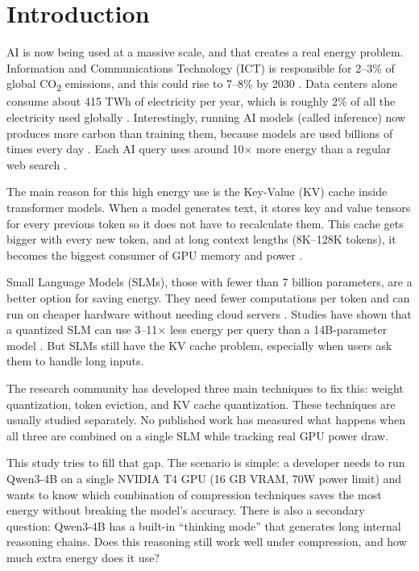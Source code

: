 \documentclass[conference]{IEEEtran}
\begin{document}
\section{Introduction}

AI is now being used at a massive scale, and that creates a real energy problem. Information and Communications Technology (ICT) is responsible for 2--3\% of global CO\textsubscript{2} emissions, and this could rise to 7--8\% by 2030 \cite{iea2024}. Data centers alone consume about 415 TWh of electricity per year, which is roughly 2\% of all the electricity used globally \cite{iea2024}. Interestingly, running AI models (called inference) now produces more carbon than training them, because models are used billions of times every day \cite{strubell2019, patterson2021}. Each AI query uses around 10$\times$ more energy than a regular web search \cite{cse407disc}.

The main reason for this high energy use is the Key-Value (KV) cache inside transformer models. When a model generates text, it stores key and value tensors for every previous token so it does not have to recalculate them. This cache gets bigger with every new token, and at long context lengths (8K--128K tokens), it becomes the biggest consumer of GPU memory and power \cite{kivi, flashattn}.

Small Language Models (SLMs), those with fewer than 7 billion parameters, are a better option for saving energy. They need fewer computations per token and can run on cheaper hardware without needing cloud servers \cite{edgeenergy2025, sustainablellm2026}. Studies have shown that a quantized SLM can use 3--11$\times$ less energy per query than a 14B-parameter model \cite{edgeenergy2025}. But SLMs still have the KV cache problem, especially when users ask them to handle long inputs.

The research community has developed three main techniques to fix this: weight quantization, token eviction, and KV cache quantization. These techniques are usually studied separately. No published work has measured what happens when all three are combined on a single SLM while tracking real GPU power draw.

This study tries to fill that gap. The scenario is simple: a developer needs to run \mbox{Qwen3-4B} on a single NVIDIA T4 GPU (16 GB VRAM, 70W power limit) and wants to know which combination of compression techniques saves the most energy without breaking the model's accuracy. There is also a secondary question: \mbox{Qwen3-4B} has a built-in ``thinking mode'' that generates long internal reasoning chains. Does this reasoning still work well under compression, and how much extra energy does it use?
\end{document}
